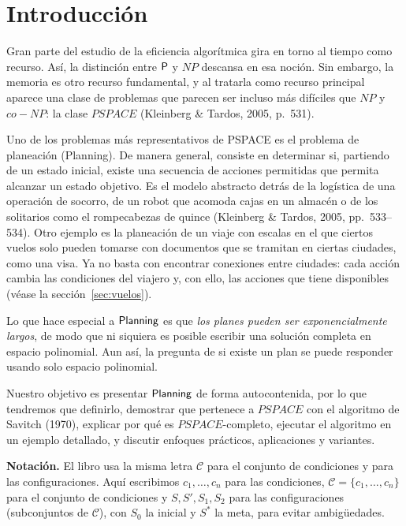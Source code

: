 \documentclass[11pt,letterpaper]{article}
\theoremstyle{plain}
\theoremstyle{definition}
\theoremstyle{remark}
\newcommand{\C}{\mathcal{C}}
\newcommand{\nombreMat}[1]{\ensuremath{\text{\fontencoding{OT1}\fontfamily{cmss}\upshape\selectfont #1}}}
\newcommand{\PSPACE}{\nombreMat{PSPACE}}
\newcommand{\NP}{\nombreMat{NP}}
\newcommand{\Pclass}{\nombreMat{P}}
\newcommand{\coNP}{\nombreMat{co-NP}}
\newcommand{\PLANNING}{\nombreMat{Planning}}
\def\PSPACE{PSPACE}\def\NP{NP}\def\coNP{co-NP}%
\begin{document}
{\hypersetup{linkcolor=ink}\tableofcontents}
\newpage

\section{Introducción}

Gran parte del estudio de la eficiencia algorítmica gira en torno
al tiempo como recurso. Así, la distinción entre $\Pclass$ y $\NP$
descansa en esa noción. Sin embargo, la memoria es otro recurso
fundamental, y al tratarla como recurso principal aparece una clase
de problemas que parecen ser incluso más difíciles que $\NP$ y
$\coNP$: la clase $\PSPACE$
(Kleinberg \& Tardos, 2005, p.~531).


 Uno de los problemas más representativos de PSPACE es el problema de planeación (Planning). De manera general, consiste en determinar si, partiendo de un estado inicial, existe una secuencia de acciones permitidas que permita alcanzar un estado objetivo. Es el modelo abstracto detrás de la logística de
una operación de socorro, de un robot que acomoda cajas en un
almacén o de los solitarios como el rompecabezas de quince
(Kleinberg \& Tardos, 2005, pp.~533--534). 
Otro ejemplo es la planeación de un viaje con escalas en el que
ciertos vuelos solo pueden tomarse con documentos que se tramitan
en ciertas ciudades, como una visa. Ya no basta con encontrar
conexiones entre ciudades: cada acción cambia las condiciones
del viajero y, con ello, las acciones que tiene disponibles
(véase la sección~\ref{sec:vuelos}).


Lo que hace especial a \PLANNING{} es que
\emph{los planes pueden ser exponencialmente largos}, de modo que
ni siquiera es posible escribir una solución completa en espacio
polinomial. Aun así, la pregunta de si existe un plan se puede
responder usando solo espacio polinomial.

Nuestro objetivo es presentar \PLANNING{} de forma autocontenida,
por lo que tendremos que definirlo, demostrar que pertenece a
$\PSPACE$ con el algoritmo de Savitch (1970), explicar por qué
es $\PSPACE$-completo, ejecutar el algoritmo en un ejemplo
detallado, y discutir enfoques prácticos, aplicaciones y variantes.

\textbf{Notación.} El libro usa la misma letra $\C$ para el conjunto
de condiciones y para las configuraciones. Aquí escribimos
$c_1,\dots,c_n$ para las condiciones,
$\C=\{c_1,\dots,c_n\}$ para el conjunto de condiciones y
$S, S', S_1, S_2$ para las configuraciones (subconjuntos de $\C$),
con $S_0$ la inicial y $S^{*}$ la meta, para evitar ambigüedades.
\end{document}
